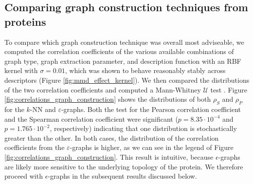 \subsection{Comparing graph construction techniques from proteins} To compare which graph
construction technique was overall most adviseable, we computed the correlation
coefficients of the various available combinations of graph type, graph
extraction parameter, and description function with an RBF kernel with
$\sigma=0.01$, which was shown to behave reasonably stably across descriptors
(Figure \ref{fig:mmd_effect_kernel}). We then compared the distributions of the
two correlation coefficients and computed a Mann-Whitney $\mathcal{U}$ test
\citep{fay2010wilcoxon}. Figure \ref{fig:correlations_graph_construction} shows
the distributions of both $\rho_S$ and $\rho_P$ for the $k$-NN and
$\varepsilon$-graphs. Both the test for the Pearson correlation coefficient and
the Spearman correlation coefficient were significant ($p=8.35\cdot 10^{-4}$ and
$p=1.765\cdot 10^{-2}$, respectively) indicating that one distribution is
stochastically greater than the other. In both cases, the distribution of the
correlation coefficients from the $\varepsilon$-graphs is higher, as we can see
in the legend of Figure \ref{fig:correlations_graph_construction}. This result
is intuitive, because $\epsilon$-graphs are likely more sensitive to the
underlying topology of the protein. We therefore proceed with $\epsilon$-graphs
in the subsequent results discussed below.

